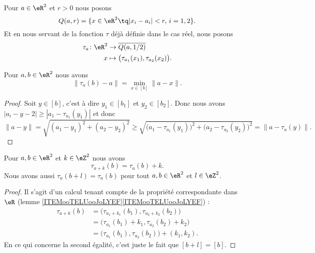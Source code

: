 Pour \( a\in \eR^2\) et \( r>0\) nous posons
\begin{equation}
	Q(a,r)=\{ x\in \eR^2\tq | x_i-a_i |<r,\,i=1,2 \}.
\end{equation}
Et en nous servant de la fonction \( \tau\) déjà définie dans le cas réel, nous posons
\begin{equation}
	\begin{aligned}
		\tau_a\colon \eR^2 & \to \overline{Q(a,1/2)}                              \\
		x                  & \mapsto \big( \tau_{a_1}(x_1),\tau_{a_2}(x_2) \big).
	\end{aligned}
\end{equation}

\begin{lemma}	\label{LEMooWYCAooYVhcoD}
	Pour \( a,b\in \eR^2\) nous avons
	\begin{equation}
		\| \tau_a(b)-a \|=\min_{x\in[b]}\| a-x \|.
	\end{equation}
\end{lemma}

\begin{proof}
	Soit \( y\in [b]\), c'est à dire \( y_1\in[b_1]\) et \( y_2\in [b_2]\). Donc nous avons \( | a_i-y-2 |\geq | a_1-\tau_{a_1}(y_1) |\) et donc
	\begin{equation}
		\| a-y \|=\sqrt{ (a_1-y_1)^2+(a_2-y_2)^2 }\geq \sqrt{\big( a_1-\tau_{a_1}(y_1) \big)^2+\big( a_2-\tau_{a_2}(y_2) \big)^2}=\| a-\tau_a(y) \|.
	\end{equation}
\end{proof}

\begin{lemma}	\label{LEMooTDKOooXBbqzK}
	Pour \( a,b\in \eR^2\) et \( k\in \eZ^2\) nous avons
	\begin{equation}
		\tau_{a+k}(b)=\tau_a(b)+k.
	\end{equation}
	Nous avons aussi \( \tau_a(b+l)=\tau_a(b)\) pour tout \( a,b\in \eR^2\) et \( l\in \eZ^2\).
\end{lemma}

\begin{proof}
	Il s'agit d'un calcul tenant compte de la propriété correspondante dans \( \eR\) (lemme \ref{ITEMooTELUooJoLYEF}\ref{ITEMooTELUooJoLYEF}) :
	\begin{subequations}
		\begin{align}
			\tau_{a+k}(b) & =\big( \tau_{a_1+k_1}(b_1),\tau_{a_2+k_2}(b_2) \big)    \\
			              & =\big( \tau_{a_1}(b_1)+k_1,\tau_{a_2}(b_2)+k_2 \big)    \\
			              & =\big( \tau_{a_1}(b_1),\tau_{a_2}(b_2) \big)+(k_1,k_2).
		\end{align}
	\end{subequations}
	En ce qui concerne la second égalité, c'est juste le fait que \( [b+l]=[b]\).
\end{proof}


